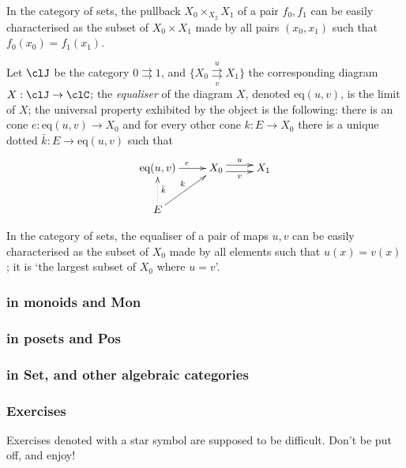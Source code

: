 \documentclass[11pt]{article}
\begin{document}
In the category of sets, the pullback $X_0 \times_{X_2} X_1$ of a pair $f_0, f_1$ can be easily characterised as the subset of $X_0\times X_1$ made by all pairs $(x_0, x_1)$ such that $f_0(x_0)=f_1(x_1)$.
\begin{example}[Equaliser]\label{ex:equal}
	Let $\clJ$ be the category $0\rightrightarrows 1$, and $\{X_0 \underset{v}{\overset{u}\rightrightarrows} X_1\}$ the corresponding diagram $X : \clJ\to \clC$; the \emph{equaliser} of the diagram $X$, denoted $\text{eq}(u,v)$, is the limit of $X$; the universal property exhibited by the object is the following: there is an cone $ e : \text{eq}(u,v) \to X_0$ and for every other cone $k : E \to X_0$ there is a unique dotted $\bar k : E \to \text{eq}(u,v)$ such that
	\[
		\vcenter{\xymatrix{
				\text{eq}(u,v) \ar[r]^e & X_0 \ar@<3pt>[r]^u \ar@<-3pt>[r]_v & X_1 \\
				E\ar[ur]^k \ar@{.>}[u]_{\bar k}
			}}
	\]
\end{example}
In the category of sets, the equaliser of a pair of maps $u,v$ can be easily characterised as the subset of $X_0$ made by all elements such that $u(x)=v(x)$; it is `the largest subset of $X_0$ where $u=v$'.

\subsubsection{in monoids and Mon}

\subsubsection{in posets and Pos}

\subsubsection{in Set, and other algebraic categories}
\subsubsection{Exercises}
Exercises denoted with a star symbol are supposed to be difficult. Don't be put off, and enjoy!
\end{document}
